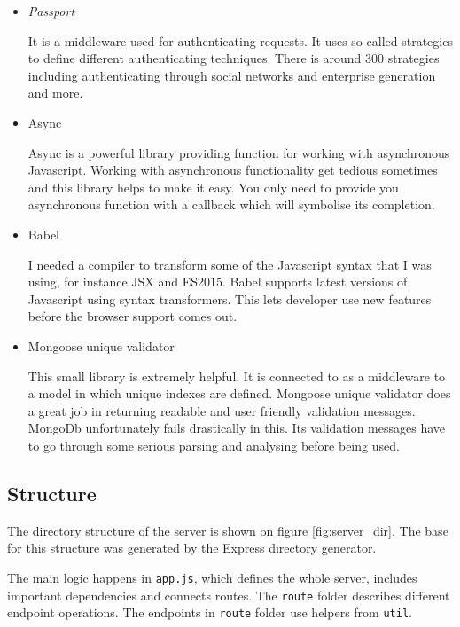 \documentclass[thesis=M,english]{FITthesis}[2012/10/20]
\begin{document}
\begin{itemize}
	\item \textit{Passport} 
	
	It is a middleware used for authenticating requests. It uses so called strategies to define different authenticating techniques. There is around 300 strategies including authenticating through social networks and enterprise generation and more. \cite{pass}
	\item {Async}
	
	Async is a powerful library providing function for working with asynchronous Javascript. Working with asynchronous functionality get tedious sometimes and this library helps to make it easy. You only need to provide you asynchronous function with a callback which will symbolise its completion.\cite{sync}
	
	\item {Babel}
	
	I needed a compiler to transform some of the Javascript syntax that I was using, for instance JSX  and ES2015. Babel supports latest versions of Javascript using syntax transformers. This lets developer use new features before the browser support comes out. \cite{babel}
	
	\item{Mongoose unique validator}
	
	This small library is extremely helpful. It is connected to as a middleware to a model in which unique indexes are defined. Mongoose unique validator does a great job in returning readable and user friendly validation messages. MongoDb unfortunately fails drastically in this. Its validation messages have to go through some serious parsing and analysing before being used. \cite{mvalid}
\end{itemize}

\subsection{Structure}

The directory structure of the server is shown on figure \ref{fig:server_dir}. The base for this structure was generated by the Express directory generator. 

The main logic happens in \verb|app.js|, which defines the whole server, includes important dependencies and connects routes.
The \verb|route| folder describes different endpoint operations. The endpoints in \verb|route| folder use helpers from \verb|util|. 
\end{document}
